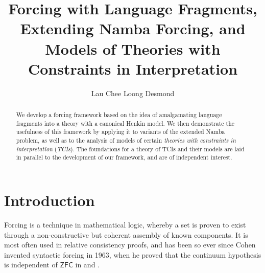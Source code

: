 \documentclass[12pt]{article}
\title{Forcing with Language Fragments, Extending Namba Forcing, and Models of Theories with Constraints in Interpretation}
\author{Lau Chee Loong Desmond}
\numberwithin{equation}{section}
\begin{document}
\maketitle

\begin{abstract}
    We develop a forcing framework based on the idea of amalgamating language fragments into a theory with a canonical Henkin model. We then demonstrate the usefulness of this framework by applying it to variants of the extended Namba problem, as well as to the analysis of models of certain \emph{theories with constraints in interpretation} (\emph{TCIs}). The foundations for a theory of TCIs and their models are laid in parallel to the development of our framework, and are of independent interest.
\end{abstract}

\newtheorem{thm}{Theorem}[section]
\newtheorem{innercustomlem}{Lemma}
\newenvironment{customlem}[1]
  {\renewcommand\theinnercustomlem{#1}\innercustomlem}
  {\endinnercustomlem}
\newtheorem{innercustomdef}{Definition}
\newenvironment{customdef}[1]
  {\renewcommand\theinnercustomdef{#1}\innercustomdef}
  {\endinnercustomdef}
\newtheorem{lem}[thm]{Lemma}
\newtheorem{prop}[thm]{Proposition}
\newtheorem{cor}[thm]{Corollary}
\newtheorem{conj}[thm]{Conjecture}
\newtheorem{ques}[thm]{Question}
\newtheorem*{claim}{Claim}
\theoremstyle{definition}
\newtheorem{defi}[thm]{Definition}
\theoremstyle{remark}
\newtheorem*{rem*}{Remark}
\newtheorem{rem}[thm]{Remark}
\newtheorem{ex}[thm]{Example}
\newtheorem{ob}[thm]{Observation}
\newtheorem{fact}[thm]{Fact}
\newtheorem{con}[thm]{Convention}

\newcommand{\bd}[1]{\mathbf{#1}}  %
\newcommand{\RR}{\mathbb{R}}      %
\newcommand{\ZZ}{\mathbb{Z}}      %
\newcommand{\col}[1]{\left[\begin{matrix} #1 \end{matrix} \right]}
\newcommand{\comb}[2]{\binom{#1^2 + #2^2}{#1+#2}}
\newcommand{\eq}{=}

\newcommand{\blankpage}{
\newpage
\thispagestyle{empty}
\mbox{}
\newpage
}

{\let\clearpage\relax \tableofcontents} 

\section{Introduction}\label{sect1}

Forcing is a technique in mathematical logic, whereby a set is proven to exist through a non-constructive but coherent assembly of known components. It is most often used in relative consistency proofs, and has been so ever since Cohen invented syntactic forcing in 1963, when he proved that the continuum hypothesis is independent of $\mathsf{ZFC}$ in \cite{cohen1} and \cite{cohen2}.
\end{document}
